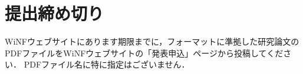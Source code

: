 \section{提出締め切り}

WiNFウェブサイトにあります期限までに，フォーマットに準拠した研究論文のPDFファイルをWiNFウェブサイトの「発表申込」ページから投稿してください．
PDFファイル名に特に指定はございません．

